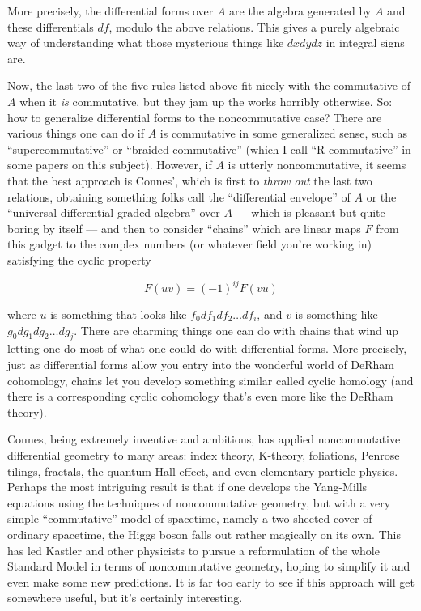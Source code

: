 \documentclass{article}
\begin{document}
More precisely, the differential forms over \(A\) are the algebra
generated by \(A\) and these differentials \(df\), modulo the above
relations. This gives a purely algebraic way of understanding what those
mysterious things like \(dx dy dz\) in integral signs are.

Now, the last two of the five rules listed above fit nicely with the
commutative of \(A\) when it \emph{is} commutative, but they jam up the
works horribly otherwise. So: how to generalize differential forms to
the noncommutative case? There are various things one can do if \(A\) is
commutative in some generalized sense, such as ``supercommutative'' or
``braided commutative'' (which I call ``R-commutative'' in some papers
on this subject). However, if \(A\) is utterly noncommutative, it seems
that the best approach is Connes', which is first to \emph{throw out}
the last two relations, obtaining something folks call the
``differential envelope'' of \(A\) or the ``universal differential
graded algebra'' over \(A\) --- which is pleasant but quite boring by
itself --- and then to consider ``chains'' which are linear maps \(F\)
from this gadget to the complex numbers (or whatever field you're
working in) satisfying the cyclic property

\[F(uv) = (-1)^{ij} F(vu)\]

where \(u\) is something that looks like \(f_0 df_1 df_2 \ldots df_i\),
and \(v\) is something like \(g_0 dg_1 dg_2 \ldots dg_j\). There are
charming things one can do with chains that wind up letting one do most
of what one could do with differential forms. More precisely, just as
differential forms allow you entry into the wonderful world of DeRham
cohomology, chains let you develop something similar called cyclic
homology (and there is a corresponding cyclic cohomology that's even
more like the DeRham theory).

Connes, being extremely inventive and ambitious, has applied
noncommutative differential geometry to many areas: index theory,
K-theory, foliations, Penrose tilings, fractals, the quantum Hall
effect, and even elementary particle physics. Perhaps the most
intriguing result is that if one develops the Yang-Mills equations using
the techniques of noncommutative geometry, but with a very simple
``commutative'' model of spacetime, namely a two-sheeted cover of
ordinary spacetime, the Higgs boson falls out rather magically on its
own. This has led Kastler and other physicists to pursue a reformulation
of the whole Standard Model in terms of noncommutative geometry, hoping
to simplify it and even make some new predictions. It is far too early
to see if this approach will get somewhere useful, but it's certainly
interesting.
\end{document}
